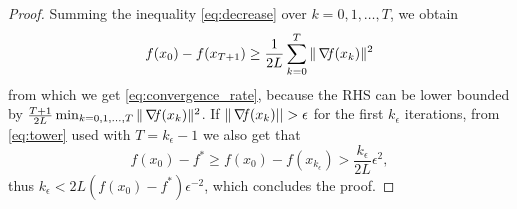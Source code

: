 \documentclass[10pt,a4paper]{article}
\begin{document}
\begin{proof}
	Summing the inequality \eqref{eq:decrease} over $k=0, 1, \dots, T$, we obtain 
	\begin{equation}\label{eq:tower}
		f(x_0) - f(x_{T+1}) \geq \frac{1}{2L}\sum_{k=0}^{T} \|\operatorname*{\mathit{\nabla \!f}}(x_k)\|^2
	\end{equation}
from which we get \eqref{eq:convergence_rate}, because the RHS can be lower bounded by $\frac{T+1}{2L} \min_{k=0,1,\dots, T} \| \operatorname*{\mathit{\nabla \!f}}(x_k)\|^2$.
If $\|\grad(x_k)||>\epsilon$ for the first $k_\epsilon$ iterations, from \eqref{eq:tower} used with $T=k_\epsilon-1$ we also get that 
\begin{equation*}
	f(x_0) -f^* \geq  f(x_0) - f(x_{k_\epsilon}) > \frac{k_\epsilon}{2L} \epsilon^2, 
\end{equation*}
thus $k_\epsilon< 2L(f(x_0) -f^*) \epsilon^{-2}$, which concludes the proof.
\end{proof}
\end{document}
